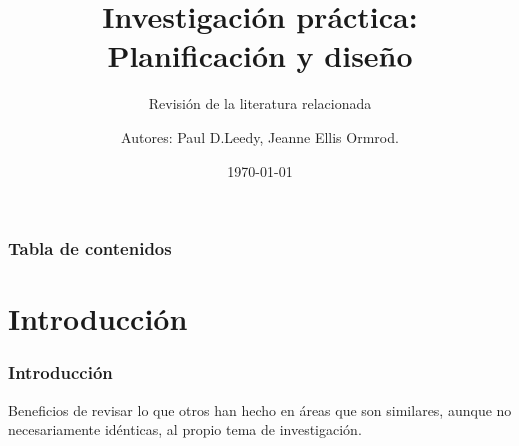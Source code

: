 \documentclass{beamer}
\begin{document}
\title{Investigaci\'on pr\'actica: Planificaci\'on y dise\~no} 
\subtitle{Revisi\'on de la literatura relacionada}   
\author{Autores: Paul D.Leedy, Jeanne Ellis Ormrod.}
\date{\today} 


\begin{frame}
\titlepage
\end{frame}

{
%
\begin{frame}
\end{frame}
}

\begin{frame}
\frametitle{Tabla de contenidos}  
    \tableofcontents[hideallsubsections]
\end{frame} 


\section{Introducci\'on} 
    \begin{frame}
        \frametitle{Introducci\'on} 
        Beneficios de revisar lo que otros han hecho en \'areas que son similares, aunque no necesariamente id\'enticas, al propio tema de investigaci\'on.
    \end{frame}
\end{document}
